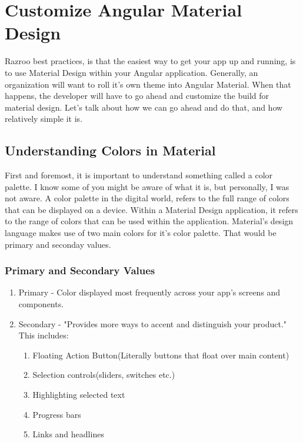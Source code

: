 
\chapter{ Customize Angular Material Design }

Razroo best practices, is that the easiest way to get your app up and running,
is to use Material Design within your Angular application. Generally, an
organization will want to roll it's own theme into Angular Material. When that
happens, the developer will have to go ahead and customize the build for 
material design. Let's talk about how we can go ahead and do that, and how
relatively simple it is.

\section{Understanding Colors in Material}
First and foremost, it is important to understand something called a color 
palette. I know some of you might be aware of what it is, but personally, I was
not aware. A color palette in the digital world, refers to the full range of 
colors that can be displayed on a device. Within a Material Design application,
it refers to the range of colors that can be used within the application. 
Material's design language makes use of two main colors for it's color palette.
That would be primary and seconday values. 

\subsection{Primary and Secondary Values}
\begin{enumerate}
  \item Primary - Color displayed most frequently across your app's screens and
  components. 
  \item Secondary - "Provides more ways to accent and distinguish your product." This includes:
  \begin{enumerate}
    \item Floating Action Button(Literally buttons that float over main content)
    \item Selection controls(sliders, switches etc.)
    \item Highlighting selected text
    \item Progress bars
    \item Links and headlines
  \end{enumerate}
\end{enumerate}

